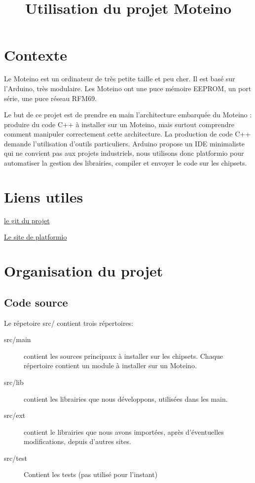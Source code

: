 \documentclass{report}
\title{Utilisation du projet Moteino}
\begin{document}
\chapter{Contexte}

Le Moteino est un ordinateur de très petite taille et peu cher. Il est basé sur l'Arduino, très modulaire. Les Moteino ont une puce mémoire EEPROM, un port série, une puce réseau RFM69.

Le but de ce projet est de prendre en main l'architecture embarquée du Moteino : produire du code C++ à installer sur un Moteino, mais surtout comprendre comment manipuler correctement cette architecture.
La production de code C++ demande l'utilisation d'outils particuliers. Arduino propose un IDE minimaliste qui ne convient pas aux projets industriels, nous utilisons donc platformio pour automatiser la gestion des librairies, compiler et envoyer le code sur les chipsets.



\chapter{Liens utiles}

\href{https://github.com/glelouet/Moteino}{le git du projet}

\href{http://platformio.org/}{Le site de platformio}

\chapter{Organisation du projet}

\section{Code source}

Le répetoire src/ contient trois répertoires:
\begin{description}
\item[src/main] contient les sources principaux à installer sur les chipsets. Chaque répertoire contient un module à installer sur un Moteino.
\item[src/lib] contient les librairies que nous développons, utilisées dans les main.
\item[src/ext] contient le librairies que nous avons importées, après d'éventuelles modifications, depuis d'autres sites.
\item[src/test] Contient les tests (pas utilisé pour l'instant)
\end{description}
\end{document}
